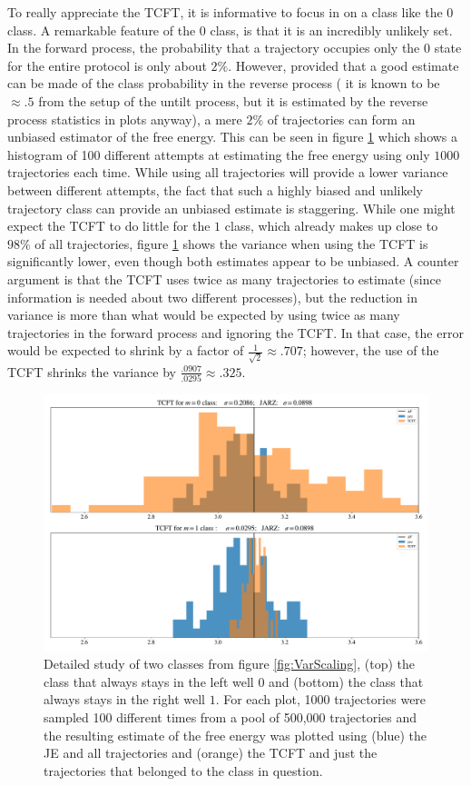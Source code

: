 \documentclass[paper=a4, fontsize=10pt]{article} %
\numberwithin{equation}{section} %
\numberwithin{figure}{section} %
\numberwithin{table}{section} %
\begin{document}
To really appreciate the TCFT, it is informative to focus in on a class like the $0$ class. A remarkable feature of the $0$ class, is that it is an incredibly unlikely set. In the forward process, the probability that a trajectory occupies only the $0$ state for the entire protocol is only about $2\%$. However, provided that a good estimate can be made of the class probability in the reverse process ( it is known to be $\approx .5$ from the setup of the untilt process, but it is estimated by the reverse process statistics in plots anyway), a mere $2\%$ of trajectories can form an unbiased estimator of the free energy. This can be seen in figure \ref{fig:ErrorCorrection} which shows a histogram of 100 different attempts at estimating the free energy using only $1000$ trajectories each time. While using all trajectories will provide a lower variance between different attempts, the fact that such a highly biased and unlikely trajectory class can provide an unbiased estimate is staggering. While one might expect the TCFT to do little for the $1$ class, which already makes up close to $98\%$ of all trajectories, figure \ref{fig:ErrorCorrection} shows the variance when using the TCFT is significantly lower, even though both estimates appear to be unbiased. A counter argument is that the TCFT uses twice as many trajectories to estimate (since information is needed about two different processes), but the reduction in variance is more than what would be expected by using twice as many trajectories in the forward process and ignoring the TCFT. In that case, the error would be expected to shrink by a factor of $\frac{1}{\sqrt{2}} \approx .707$; however, the use of the TCFT shrinks the variance by $\frac{.0907}{.0295} \approx  .325$.

\begin{figure}
\centering
\includegraphics[width=.8\columnwidth, trim=0 0 0 0, clip]{ErrorCorrection.pdf}
\caption{Detailed study of two classes from figure \ref{fig:VarScaling}, (top) the class that always stays in the left well $0$ and (bottom) the class that always stays in the right well $1$. For each plot, 1000 trajectories were sampled 100 different times from a pool of 500,000 trajectories and the resulting estimate of the free energy was plotted using (blue) the JE and all trajectories and (orange) the TCFT and just the trajectories that belonged to the class in question.
}
\label{fig:ErrorCorrection}
\end{figure}
\end{document}
